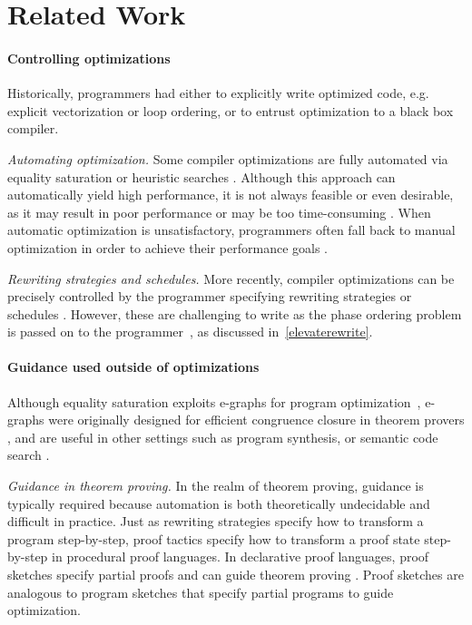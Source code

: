 \section{Related Work}

\paragraph{\textbf{Controlling optimizations}}
Historically, programmers had either to explicitly write optimized code, e.g. explicit vectorization or loop ordering, or to entrust optimization to a black box compiler.

\emph{Automating optimization.}
Some compiler optimizations are fully automated via equality saturation \cite{tate2009-equality-saturation, yang2021-eqsat-tensor} or heuristic searches \cite{lift-rewrite-2015, polymage-2015}.
Although this approach can automatically yield high performance, it is not always feasible or even desirable, as it may result in poor performance or may be too time-consuming \cite{maleki2011-vectorizing-compilers, parello2004-pragmatic-opt}.
When automatic optimization is unsatisfactory, programmers often fall back to manual optimization in order to achieve their performance goals \cite{niittylahti2002-high-perf, hlt-lacassagne-2014, lemaitre2017-cholesky}.

\emph{Rewriting strategies and schedules.}
More recently, compiler optimizations can be precisely controlled by the programmer specifying rewriting strategies \cite{visser1998-strategies, hagedorn2020-elevate, koehler2021-elevate-imgproc} or schedules \cite{halide-2012, chen2018-tvm}.
However, these are challenging to write as the phase ordering problem is passed on to the programmer~\cite{ikarashi2021-guided}, as discussed in~\cref{elevaterewrite}.

\paragraph{\textbf{Guidance used outside of optimizations}}
Although equality saturation exploits e-graphs for program optimization~\cite{tate2009-equality-saturation}, e-graphs were originally designed for efficient congruence closure in theorem provers \cite{nelson1980-techniques, de2008-z3}, and are useful in other settings such as program synthesis, or semantic code search \cite{premtoon2020-yogo}.

\emph{Guidance in theorem proving.}
In the realm of theorem proving, guidance is typically required because automation is both theoretically undecidable and difficult in practice.
Just as rewriting strategies specify how to transform a program step-by-step, proof tactics \cite{gordon1979-edinburgh} specify how to transform a proof state step-by-step in procedural proof languages.
In declarative proof languages, proof sketches specify partial proofs and can guide theorem proving \cite{wiedijk2003-formal-proof-sketches, corbineau2007-declarative-coq}. Proof sketches are analogous to program sketches that specify partial programs to guide optimization.

